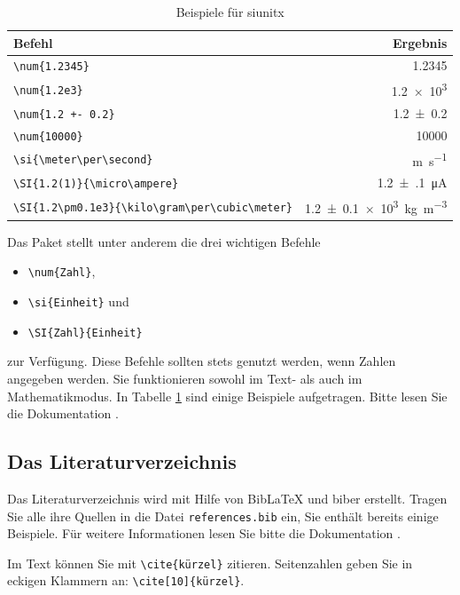 \begin{table}
    \centering
    \caption{Beispiele für siunitx}
    \label{tab:si}
    \begin{tabular}{l r}
        \toprule
        Befehl     &   Ergebnis \\
        \midrule
        \verb+\num{1.2345}+ & \num{1.2345} \\
        \verb+\num{1.2e3}+ & \num{1.2e3} \\
        \verb_\num{1.2 +- 0.2}_ & \num{1.2+-0.2} \\
        \verb+\num{10000}+ & \num{10000} \\
        \verb+\si{\meter\per\second}+ & \si{\meter\per\second} \\
        \verb+\SI{1.2(1)}{\micro\ampere}+ & \SI{1.2(1)}{\micro\ampere} \\
        \verb+\SI{1.2\pm0.1e3}{\kilo\gram\per\cubic\meter}+ & \SI{1.2\pm0.1e3}{\kilo\gram\per\cubic\meter} \\
        \bottomrule 
    \end{tabular}
\end{table}

Das Paket stellt unter anderem die drei wichtigen Befehle
\begin{itemize}
    \item \texttt{\textbackslash num\{Zahl\}},
    \item \texttt{\textbackslash si\{Einheit\}} und
    \item \texttt{\textbackslash SI\{Zahl\}\{Einheit\}}
\end{itemize}
zur Verfügung.
Diese Befehle sollten stets genutzt werden, wenn Zahlen angegeben werden. 
Sie funktionieren sowohl im Text- als auch im Mathematikmodus.
In Tabelle \ref{tab:si} sind einige Beispiele aufgetragen. Bitte lesen Sie die Dokumentation \cite{siunitx}.

\subsection{Das Literaturverzeichnis}

Das Literaturverzeichnis wird mit Hilfe von BibLaTeX und biber erstellt.
Tragen Sie alle ihre Quellen in die Datei \texttt{references.bib} ein, Sie enthält bereits
einige Beispiele. Für weitere Informationen lesen Sie bitte die Dokumentation \cite{biblatex}.

Im Text können Sie mit \verb_\cite{kürzel}_ zitieren. Seitenzahlen geben Sie in eckigen Klammern an:
\verb_\cite[10]{kürzel}_. 


